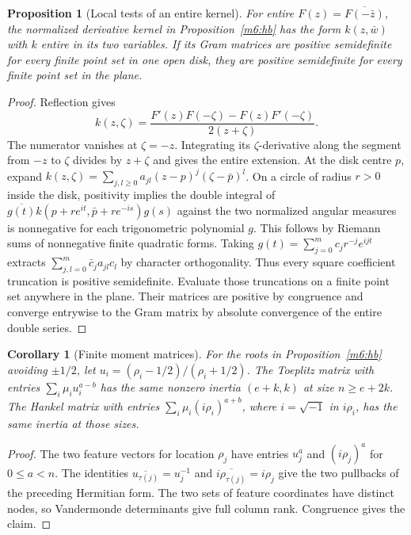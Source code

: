 \documentclass[11pt,reqno]{amsart}
\newtheorem{proposition}[theorem]{Proposition}
\newtheorem{corollary}[theorem]{Corollary}
\theoremstyle{definition}
\theoremstyle{remark}
\numberwithin{equation}{section}
\begin{document}
\begin{proposition}[Local tests of an entire kernel]\label{m6:kernel-local}
For entire \(F(z)=\overline{F(-\bar z)}\), the normalized
derivative kernel in Proposition~\ref{m6:hb} has the form
\(k(z,\bar w)\) with \(k\) entire in its two variables.
If its Gram matrices are positive semidefinite for every finite
point set in one open disk, they are positive semidefinite
for every finite point set in the plane.
\end{proposition}
\begin{proof}
Reflection gives
\[
 k(z,\zeta)=
 \frac{F'(z)F(-\zeta)-F(z)F'(-\zeta)}{2(z+\zeta)} .
\]
The numerator vanishes at \(\zeta=-z\). Integrating its
\(\zeta\)-derivative along the segment from \(-z\) to \(\zeta\)
divides by \(z+\zeta\) and gives the entire extension.
At the disk centre \(p\), expand
\(k(z,\zeta)=\sum_{j,l\ge0} a_{jl}(z-p)^j(\zeta-\bar p)^l\).
On a circle of radius \(r>0\) inside the disk, positivity implies
the double integral of
\(\overline{g(t)}k(p+re^{it},\bar p+re^{-is})g(s)\)
against the two normalized angular measures is nonnegative
for each trigonometric polynomial \(g\). This follows by
Riemann sums of nonnegative finite quadratic forms.
Taking \(g(t)=\sum_{j=0}^m c_j r^{-j}e^{ijt}\) extracts
\(\sum_{j,l=0}^m \bar c_j a_{jl}c_l\) by character orthogonality.
Thus every square coefficient truncation is positive
semidefinite. Evaluate those truncations on a finite point set
anywhere in the plane. Their matrices are positive by
congruence and converge entrywise to the Gram matrix by
absolute convergence of the entire double series.
\end{proof}

\begin{corollary}[Finite moment matrices]\label{m6:moment}
For the roots in Proposition~\ref{m6:hb} avoiding \(\pm1/2\),
let \(u_i=(\rho_i-1/2)/(\rho_i+1/2)\).
The Toeplitz matrix with entries \(\sum_i\mu_i u_i^{a-b}\)
has the same nonzero inertia \((e+k,k)\) at size
\(n\ge e+2k\). The Hankel matrix with entries
\(\sum_i\mu_i(i\rho_i)^{a+b}\), where \(i=\sqrt{-1}\) in
\(i\rho_i\), has the same inertia at those sizes.
\end{corollary}
\begin{proof}
The two feature vectors for location \(\rho_j\) have entries
\(u_j^a\) and \((i\rho_j)^a\) for \(0\le a<n\).
The identities \(\overline{u_{\tau(j)}}=u_j^{-1}\) and
\(\overline{i\rho_{\tau(j)}}=i\rho_j\) give the two pullbacks
of the preceding Hermitian form. The two sets of feature
coordinates have distinct nodes, so Vandermonde determinants
give full column rank. Congruence gives the claim.
\end{proof}
\end{document}
